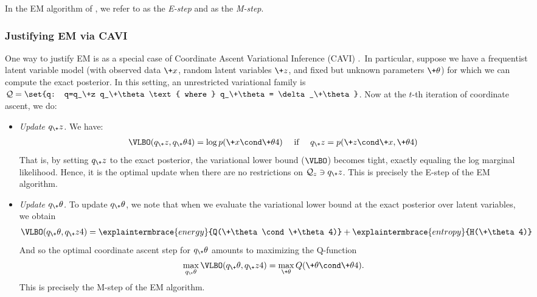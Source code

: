 \documentclass{article} %
\newcommand{\param}{\+\theta}
\begin{document}
In the EM algorithm of 
, we refer to  as the \textit{E-step} and  as the \textit{M-step}.

\subsubsection{Justifying EM via CAVI}

  One way to justify EM is as a special case of Coordinate Ascent Variational Inference (CAVI) \cite{wojnowiczXXXXvariational}.\footnotemark~In particular, suppose we have a frequentist latent variable model (with observed data $\+x$, random latent variables $\+z$, and fixed but unknown parameters $\param$) for which we can compute the exact posterior.  In this setting, an unrestricted variational family is $\mathcal{Q} = \set{q: q=q_\+z q_\param \text{ where } q_\param = \delta_\param}$.  Now at the $t$-th iteration of coordinate ascent, we do:


\begin{itemize}
\item \textit{Update $q_\+z$.} We have:
%
\begin{align}
\VLBO(q_\+z, q_\param^^t) = \log p(\+x \cond \param^^t) \quad \text{ if } \quad 	q_\+z=p(\+z \cond \+x, \param^^t)
\end{align}
%
That is, by setting $q_\+z$ to the exact posterior, the variational lower bound ($\VLBO$) becomes tight, exactly equaling the log marginal likelihood. Hence, it is the optimal update when there are no restrictions on $\mathcal{Q}_z \ni q_\+z$.  This is precisely the E-step of the EM algorithm.

\item \textit{Update $q_\param$.}	 To update $q_\param$, we note that when we evaluate the variational lower bound at the exact posterior over latent variables, we obtain
%
\begin{align}
\VLBO(q_\param, q_\+z^^t) = \explaintermbrace{energy}{Q(\param \cond \param^^t)} + \explaintermbrace{entropy}{H(\param^^t)}
\end{align}
%
And so the optimal coordinate ascent step for $q_\param$ amounts to maximizing the Q-function
%
\begin{align}
\max_{q_\param} \VLBO(q_\param, q_\+z^^t) = \max_{\param}  Q(\param \cond \param^^t). 
\end{align}
%
This is precisely the M-step of the EM algorithm.
\end{itemize}
%
\end{document}

